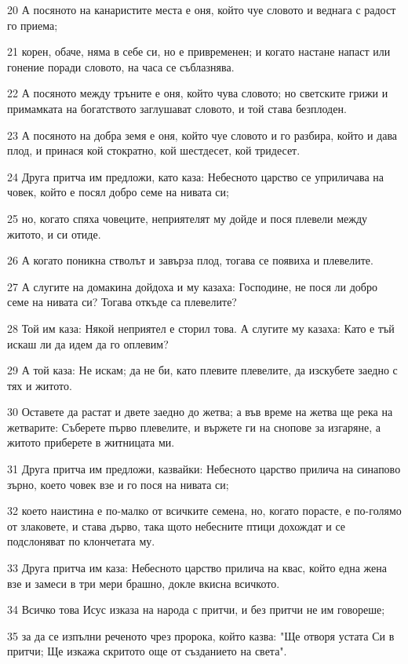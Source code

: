 \par 20 А посяното на канаристите места е оня, който чуе словото и веднага с радост го приема;
\par 21 корен, обаче, няма в себе си, но е привременен; и когато настане напаст или гонение поради словото, на часа се съблазнява.
\par 22 А посяното между тръните е оня, който чува словото; но светските грижи и примамката на богатството заглушават словото, и той става безплоден.
\par 23 А посяното на добра земя е оня, който чуе словото и го разбира, който и дава плод, и принася кой стократно, кой шестдесет, кой тридесет.
\par 24 Друга притча им предложи, като каза: Небесното царство се уприличава на човек, който е посял добро семе на нивата си;
\par 25 но, когато спяха човеците, неприятелят му дойде и пося плевели между житото, и си отиде.
\par 26 А когато поникна стволът и завърза плод, тогава се появиха и плевелите.
\par 27 А слугите на домакина дойдоха и му казаха: Господине, не пося ли добро семе на нивата си? Тогава откъде са плевелите?
\par 28 Той им каза: Някой неприятел е сторил това. А слугите му казаха: Като е тъй искаш ли да идем да го оплевим?
\par 29 А той каза: Не искам; да не би, като плевите плевелите, да изскубете заедно с тях и житото.
\par 30 Оставете да растат и двете заедно до жетва; а във време на жетва ще река на жетварите: Съберете първо плевелите, и вържете ги на снопове за изгаряне, а житото приберете в житницата ми.
\par 31 Друга притча им предложи, казвайки: Небесното царство прилича на синапово зърно, което човек взе и го пося на нивата си;
\par 32 което наистина е по-малко от всичките семена, но, когато порасте, е по-голямо от злаковете, и става дърво, така щото небесните птици дохождат и се подслоняват по клончетата му.
\par 33 Друга притча им каза: Небесното царство прилича на квас, който една жена взе и замеси в три мери брашно, докле вкисна всичкото.
\par 34 Всичко това Исус изказа на народа с притчи, и без притчи не им говореше;
\par 35 за да се изпълни реченото чрез пророка, който казва: "Ще отворя устата Си в притчи; Ще изкажа скритото още от създанието на света".
